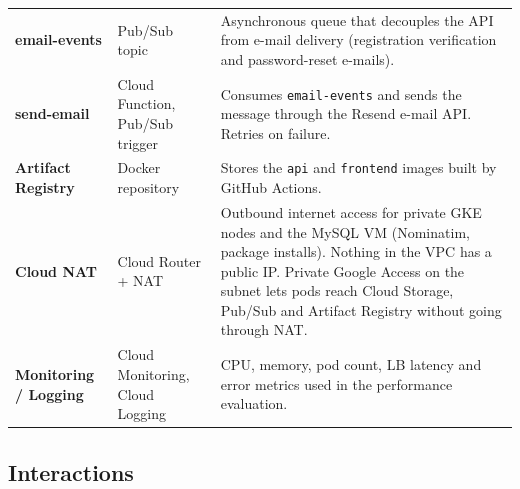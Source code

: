 \documentclass[11pt,a4paper]{article}
\newcommand{\code}[1]{\texttt{#1}}
\begin{document}
{\begin{longtable}{L{3.1cm}L{4.3cm}L{7.6cm}}
\textbf{email-events} & Pub/Sub topic &
  Asynchronous queue that decouples the API from e-mail delivery
  (registration verification and password-reset e-mails). \\
\textbf{send-email} & Cloud Function, Pub/Sub trigger &
  Consumes \code{email-events} and sends the message through the Resend e-mail
  API. Retries on failure. \\
\textbf{Artifact Registry} & Docker repository &
  Stores the \code{api} and \code{frontend} images built by GitHub Actions. \\
\textbf{Cloud NAT} & Cloud Router + NAT &
  Outbound internet access for private GKE nodes and the MySQL VM (Nominatim,
  package installs). Nothing in the VPC has a public IP. Private Google Access
  on the subnet lets pods reach Cloud Storage, Pub/Sub and Artifact Registry
  without going through NAT. \\
\textbf{Monitoring / Logging} & Cloud Monitoring, Cloud Logging &
  CPU, memory, pod count, LB latency and error metrics used in the performance
  evaluation. \\
\end{longtable}
}

\subsection{Interactions}
\end{document}
